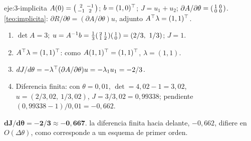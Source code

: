 \begin{solucion}{eje:3-implicita}
\datos $A(0)=\begin{psmallmatrix}2&-1\\-1&2\end{psmallmatrix}$; $b=(1,0)^\top$; $J=u_1+u_2$; $\partial A/\partial\theta=\begin{psmallmatrix}1&0\\0&0\end{psmallmatrix}$.
\planteamiento \cref{teo:implicita}: $\partial R/\partial\theta=(\partial A/\partial\theta)u$, adjunto $A^\top\lambda=(1,1)^\top$.
\pasos
\begin{enumerate}[label=\arabic*.]
  \item $\det A=3$; $u=A^{-1}b=\tfrac13\begin{psmallmatrix}2&1\\1&2\end{psmallmatrix}\begin{psmallmatrix}1\\0\end{psmallmatrix}=(2/3,\ 1/3)$; $J=1$.
  \item $A^\top\lambda=(1,1)^\top$: como $A(1,1)^\top=(1,1)^\top$, $\lambda=(1,1)$.
  \item $dJ/d\theta=-\lambda^\top(\partial A/\partial\theta)u=-\lambda_1u_1=-2/3$.
  \item Diferencia finita: con $\theta=0{,}01$, $\det=4{,}02-1=3{,}02$, $u=(2/3{,}02,\ 1/3{,}02)$, $J=3/3{,}02=0{,}99338$; pendiente $(0{,}99338-1)/0{,}01=-0{,}662$.
\end{enumerate}
\resultado $\mathbf{dJ/d\theta=-2/3\approx-0{,}667}$.
\comprobacion la diferencia finita hacia delante, $-0{,}662$, difiere en $O(\Delta\theta)$, como corresponde a un esquema de primer orden.
\end{solucion}

